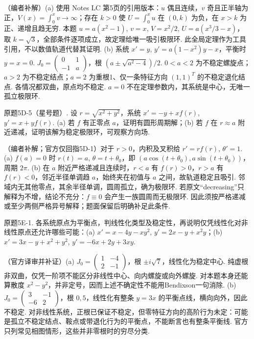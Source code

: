 \begin{solution}（编者补解）(a) 使用 Notes LC 第5页的引用版本：$u$ 偶且连续，$v$ 奇且正半轴为正，$V(x)=\int_0^xv\to\infty$；存在 $k>0$ 使 $U=\int_0^xu$ 在 $(0,k)$ 为负，在 $x>k$ 为正、递增且趋无穷. 本题 $u=a(x^2-1)$, $v=x$, $V=x^2/2$, $U=a(x^3/3-x)$，取 $k=\sqrt3$，全部条件逐项成立，故定理给唯一吸引极限环. 此全局定理作为工具引用，不以数值轨道代替其证明. (b) 系统 $x'=y$, $y'=a(1-x^2)y-x$，平衡时 $y=x=0$. $J_0=\begin{pmatrix}0&1\\-1&a\end{pmatrix}$，根 $(a\pm\sqrt{a^2-4})/2$. $0<a<2$ 为不稳定螺旋点；$a>2$ 为不稳定结点；$a=2$ 为重根1、仅一条特征方向 $(1,1)^T$ 的不稳定退化结点. 各情况都双曲，原点均不稳定. $a=0$ 不在定理参数内，其系统是中心，无唯一孤立极限环.\end{solution}
\begin{exercise}\label{cw:bank-5D-5}原题5D-5（星号题）. 设 $r=\sqrt{x^2+y^2}$，系统 $x'=-y+xf(r)$, $y'=x+yf(r)$. (a) 若 $f$ 有正零点 $a$，证明有圆形周期解；(b) 若 $f$ 在 $r\approx a$ 附近递减，证明该解为稳定极限环，可观察方向场.\end{exercise}
\begin{solution}（编者补解；官方仅回指5D-1）对于 $r>0$，内积及叉积给 $r'=rf(r)$, $\theta'=1$. (a) $f(a)=0$ 时 $r(t)=a$, $\theta=t+\theta_0$，即 $(a\cos(t+\theta_0),a\sin(t+\theta_0))$，周期 $2\pi$. (b) 在 $a$ 附近严格递减且连续时，$r<a$ 有 $f(r)>0$，$r>a$ 有 $f(r)<0$，邻近半径单调趋 $a$，始终夹在初值与 $a$ 之间，故轨道稳定且吸引. 邻域内无其他零点，其余半径单调，圆周孤立，确为极限环. 若原文“decreasing”只解释为不增，结论不充分：$f\equiv0$ 会产生一族圆周而无极限环. 因此须按严格递减或至少两侧严格异号解释；题面保留后明确补足此条件.\end{solution}
\begin{exercise}\label{cw:bank-5E-1}原题5E-1. 各系统原点为平衡点，判线性化类型及稳定性，再说明仅凭线性化对非线性原点还允许哪些可能：(a) $x'=x-4y-xy^2$, $y'=2x-y+x^2y$；(b) $x'=3x-y+x^2+y^2$, $y'=-6x+2y+3xy$.\end{exercise}
\begin{solution}（官方译审并补证）(a) $J_0=\begin{pmatrix}1&-4\\2&-1\end{pmatrix}$，根 $\pm i\sqrt7$，线性化为稳定中心. 纯虚根非双曲，仅凭一阶项不能区分非线性中心、向内螺旋或向外螺旋. 对本题本身还能算散度 $x^2-y^2$，并非定号，因而上述不确定性不能用Bendixson一句消除. (b) $J_0=\begin{pmatrix}3&-1\\-6&2\end{pmatrix}$，根 $0,5$，线性化有整条 $y=3x$ 的平衡点线，横向向外，因此不稳定. 对非线性系统，正根已保证不稳定，但零特征方向的高阶行为未定：可能是孤立不稳定结点、鞍点或带退化行为的平衡点，不能断言也有整条平衡线. 官方只列常见相图情形，这些并非零根时的穷尽分类.\end{solution}
